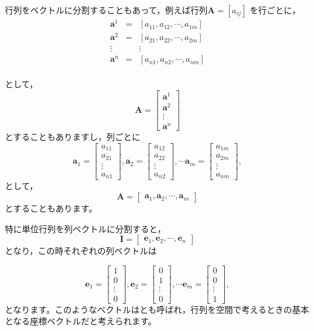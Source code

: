 \documentclass{ltjsbook}
\begin{document}
行列をベクトルに分割することもあって，例えば行列$\bm{A} = [ a_{ij} ] $ を行ごとに，
\[
	\begin{array}{ccc}
		\bm{a}^{1} & = & \left[ a_{11}, a_{12}, \cdots, a_{1m} \right] \\
		\bm{a}^{2} & = & \left[ a_{21}, a_{22}, \cdots, a_{2m} \right] \\
		\vdots     &   & \vdots                                        \\
		\bm{a}^{n} & = & \left[ a_{n1}, a_{n2}, \cdots, a_{nm} \right] \\
	\end{array}
\]

として，
\[
	\bm{A} = \begin{bmatrix} \bm{a}^1 \\ \bm{a}^2 \\ \vdots \\ \bm{a}^n \end{bmatrix}
\]
とすることもありますし，列ごとに
\[
	\bm{a}_1 = \begin{bmatrix} a_{11}\\ a_{21} \\ \vdots \\ a_{n1} \end{bmatrix} ,
	\bm{a}_2 = \begin{bmatrix} a_{12}\\ a_{22} \\ \vdots \\ a_{n2} \end{bmatrix} ,
	\cdots
	\bm{a}_m = \begin{bmatrix} a_{1m}\\ a_{2m} \\ \vdots \\ a_{nm} \end{bmatrix} ,
\]
として，
\[
	\bm{A} = \begin{bmatrix} \bm{a}_1, \bm{a}_2, \cdots, \bm{a}_m\end{bmatrix}
\]
とすることもあります。

特に単位行列を列ベクトルに分割すると，
\[
	\bm{I} = \begin{bmatrix} \bm{e}_1, \bm{e}_2, \cdots, \bm{e}_n \end{bmatrix}
\]
となり，この時それぞれの列ベクトルは

\[
	\bm{e}_1 = \begin{bmatrix} 1\\ 0 \\ \vdots \\ 0 \end{bmatrix} ,
	\bm{e}_2 = \begin{bmatrix} 0\\ 1 \\ \vdots \\ 0 \end{bmatrix} ,
	\cdots
	\bm{e}_m = \begin{bmatrix} 0\\ 0 \\ \vdots \\ 1 \end{bmatrix} ,
\]
となります。このようなベクトルはとも呼ばれ，行列を空間で考えるときの基本となる座標ベクトルだと考えられます。
\end{document}
